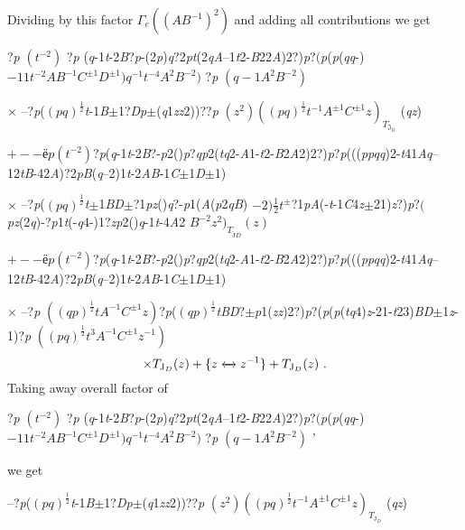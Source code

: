 \documentclass[a4paper,12pt]{article}
\begin{document}
Dividing by this factor $\Gamma_{e}((AB^{-1})^{2})$ and adding all contributions we get

?{\it p} $(t^{-2})$ ?{\it p} ({\it q}-1{\it t}-2{\it B}?{\it p}-(2{\it p}){\it q}?2{\it pt}(2{\it qA}--1{\it t}2-{\it B}22{\it A})2?){\it p}?$(${\it p}({\it p}({\it qq}-) $-11t^{-2}AB^{-1}C^{\pm 1}D^{\pm 1})q^{-1}t^{-4}A^{2}B^{-2})$ ?{\it p} $(q-1A^{2}B^{-2})$

$\times$ --?{\it p}($(pq)^{\frac{1}{2}}${\it t}-1{\it B}$\pm$1?{\it Dp}$\pm$({\it q}1{\it zz}2))??{\it p} $(z^{2})((pq)^{\frac{1}{2}}t^{-1}A^{\pm 1}C^{\pm 1}z)_{T_{\mathfrak{J}_{D}}}$ ({\it qz})

$+--ё p (t^{-2})$?{\it p}({\it q}-1{\it t}-2{\it B}?-{\it p}2(){\it p}?{\it qp}2({\it tq}2-{\it A}1-{\it t}2-{\it B}2{\it A}2)2?){\it p}?{\it p}((({\it ppqq})2-{\it t}41{\it Aq}--12{\it tB}-42{\it A})?2{\it pB}({\it q}--2)1{\it t}-2{\it AB}-1{\it C}$\pm$1{\it D}$\pm$1)

$\times$ --?{\it p}($(pq)^{\frac{1}{2}}${\it t}$\pm$1{\it BD}$\pm$?1{\it pz}(){\it q}?-{\it p}1({\it A}({\it p}2{\it qB}) $-2)\displaystyle \frac{1}{2}t^{\pm}$?1{\it pA}(-{\it t}-1{\it C}4{\it z}$\pm$21){\it z}?){\it p}?$(${\it pz}(2{\it q})-?{\it p}1{\it t}(-{\it q}4-)1?{\it zp}2(){\it q}-1{\it t}-4{\it A}2 $B^{-2}z^{2})_{T_{\tilde{\mathrm{J}}D}}(z)$

$+--ё p (t^{-2})$?{\it p}({\it q}-1{\it t}-2{\it B}?-{\it p}2(){\it p}?{\it qp}2({\it tq}2-{\it A}1-{\it t}2-{\it B}2{\it A}2)2?){\it p}?{\it p}((({\it ppqq})2-{\it t}41{\it Aq}--12{\it tB}-42{\it A})?2{\it pB}({\it q}--2)1{\it t}-2{\it AB}-1{\it C}$\pm$1{\it D}$\pm$1)

$\times$ --?{\it p} $((qp)^{\frac{1}{2}}tA^{-1}C^{\pm 1}z)$?{\it p}($(qp)^{\frac{1}{2}}${\it tBD}?$\pm${\it p}1({\it zz})2?){\it p}?({\it p}({\it p}({\it tq}4){\it z}-21-{\it t}23){\it BD}$\pm$1{\it z}-1)?{\it p} $((pq)^{\frac{1}{2}}t^{3}A^{-1}C^{\pm 1}z^{-1})$
$$
\times T_{\mathrm{J}_{D}}(z)+\{z\xleftrightarrow{}z^{-1}\}+T_{\mathrm{J}_{D}}(z)\ .
$$
Taking away overall factor of

?{\it p} $(t^{-2})$ ?{\it p} ({\it q}-1{\it t}-2{\it B}?{\it p}-(2{\it p}){\it q}?2{\it pt}(2{\it qA}--1{\it t}2-{\it B}22{\it A})2?){\it p}?$(${\it p}({\it p}({\it qq}-) $-11t^{-2}AB^{-1}C^{\pm 1}D^{\pm 1})q^{-1}t^{-4}A^{2}B^{-2})$ ?{\it p} $(q-1A^{2}B^{-2})$ '

we get

--?{\it p}($(pq)^{\frac{1}{2}}${\it t}-1{\it B}$\pm$1?{\it Dp}$\pm$({\it q}1{\it zz}2))??{\it p} $(z^{2})((pq)^{\frac{1}{2}}t^{-1}A^{\pm 1}C^{\pm 1}z)_{T_{\mathrm{J}_{D}}}$ ({\it qz})
\end{document}
